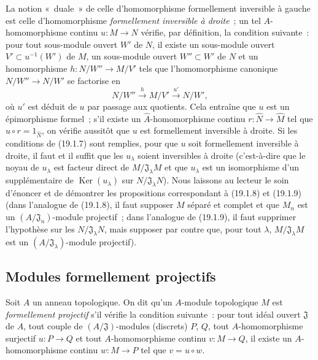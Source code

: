 \begin{remark}[19.1.15]
\label{0.19.1.15-fr}
La notion «~duale~» de celle d'homomorphisme formellement inversible à gauche
est celle d'homomorphisme \emph{formellement inversible à droite}~; un tel
$A$-homomorphisme continu $u:M\to N$ vérifie, par définition, la condition
suivante~: pour tout sous-module ouvert $W'$ de $N$, il existe un sous-module
ouvert $V'\subset u^{-1}(W')$ de $M$, un sous-module ouvert $W''\subset W'$ de
$N$ et un homomorphisme $h:N/W''\to M/V'$ tels que l'homomorphisme canonique
$N/W''\to N/W'$ se factorise en
\[
  N/W''\xrightarrow{h}M/V'\xrightarrow{u'}N/W',
\]
où $u'$ est déduit de $u$ par passage aux quotients. Cela entraîne que $u$ est
un épimorphisme formel~; s'il existe un $\widehat A$-homomorphisme continu
$r:\widehat N\to\widehat M$ tel que $\widehat u\circ r=1_{\widehat N}$, on
vérifie aussitôt que $u$ est formellement inversible à droite. Si les
conditions de (19.1.7) sont remplies, pour que $u$ soit formellement inversible
à droite, il faut et il suffit que les $u_\lambda$ soient inversibles à droite
(c'est-à-dire que le noyau de $u_\lambda$ est facteur direct de
$M/\mathfrak J_\lambda M$ et que $u_\lambda$ est un isomorphisme d'un
supplémentaire de $\operatorname{Ker}(u_\lambda)$ sur
$N/\mathfrak J_\lambda N$). Nous laissons au lecteur le soin d'énoncer et de
démontrer les propositions correspondant à (19.1.8) et (19.1.9) (dans
l'analogue de (19.1.8), il faut supposer $M$ séparé et complet et que $M_n$ est
un $(A/\mathfrak J_n)$-module projectif~; dans l'analogue de (19.1.9), il faut
supprimer l'hypothèse sur les $N/\mathfrak J_\lambda N$, mais supposer par
contre que, pour tout $\lambda$, $M/\mathfrak J_\lambda M$ est un
$(A/\mathfrak J_\lambda)$-module projectif).
\end{remark}

\subsection{Modules formellement projectifs}
\label{subsection:0.19.2-fr}

\begin{definition}[19.2.1]
\label{0.19.2.1-fr}
Soit $A$ un anneau topologique. On dit qu'un $A$-module topologique $M$ est
\emph{formellement projectif} s'il vérifie la condition suivante~: pour tout
idéal ouvert $\mathfrak J$ de $A$, tout couple de $(A/\mathfrak J)$-modules
(discrets) $P$, $Q$, tout $A$-homomorphisme surjectif $u:P\to Q$ et tout
$A$-homomorphisme continu $v:M\to Q$, il existe un $A$-homomorphisme continu
$w:M\to P$ tel que $v=u\circ w$.
\end{definition}

